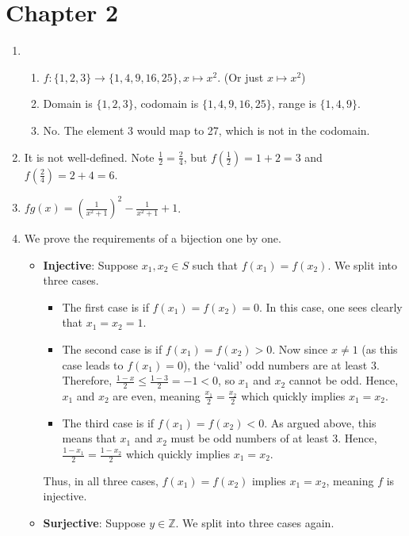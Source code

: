 \section*{Chapter 2}
\begin{enumerate}
    \item \begin{enumerate}[label=(\roman*)]
        \item $f: \{1, 2, 3\} \to \{1, 4, 9, 16, 25\}, x \mapsto x^2$. (Or just $x \mapsto x^2$)
        \item Domain is $\{1, 2, 3\}$, codomain is $\{1, 4, 9, 16, 25\}$, range is $\{1, 4, 9\}$.
        \item No. The element 3 would map to 27, which is not in the codomain.
    \end{enumerate}
    \item It is not well-defined. Note $\frac 12 = \frac 24$, but $f(\frac12) = 1 + 2 = 3$ and $f(\frac24) = 2 + 4 = 6$.
    \item $fg(x) = \left(\frac1{x^2+1}\right)^2 - \frac1{x^2+1} + 1$.
    \item We prove the requirements of a bijection one by one.
    \begin{itemize}
        \item \textbf{Injective}: Suppose $x_1, x_2 \in S$ such that $f(x_1) = f(x_2)$. We split into three cases.
        \begin{itemize}
            \item The first case is if $f(x_1) = f(x_2) = 0$. In this case, one sees clearly that $x_1 = x_2 = 1$.
            \item The second case is if $f(x_1) = f(x_2) > 0$. Now since $x \neq 1$ (as this case leads to $f(x_1) = 0$), the `valid' odd numbers are at least 3. Therefore, $\frac{1-x}{2} \leq \frac{1-3}{2} = -1 < 0$, so $x_1$ and $x_2$ cannot be odd. Hence, $x_1$ and $x_2$ are even, meaning $\frac{x_1}{2} = \frac{x_2}{2}$ which quickly implies $x_1 = x_2$.
            \item The third case is if $f(x_1) = f(x_2) < 0$. As argued above, this means that $x_1$ and $x_2$ must be odd numbers of at least 3. Hence, $\frac{1-x_1}{2} = \frac{1-x_2}{2}$ which quickly implies $x_1 = x_2$.
        \end{itemize}
        Thus, in all three cases, $f(x_1) = f(x_2)$ implies $x_1 = x_2$, meaning $f$ is injective.
        \item \textbf{Surjective}: Suppose $y \in \mathbb{Z}$. We split into three cases again.

\end{itemize}
\end{enumerate}
